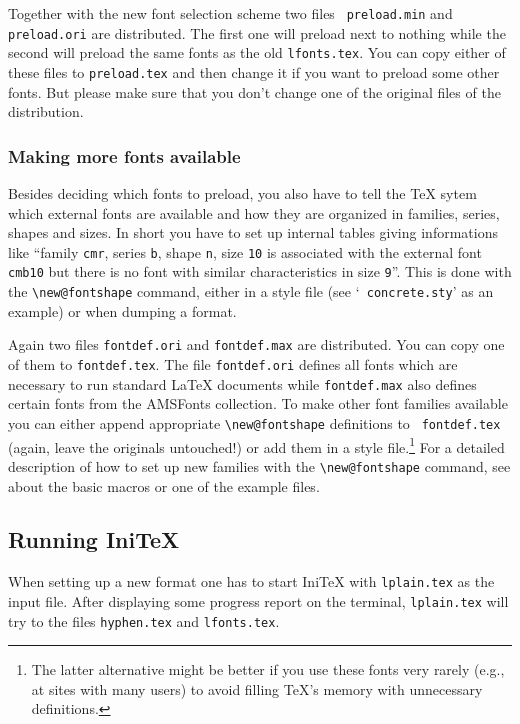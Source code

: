  Together with the new font selection scheme two files {\tt
 preload.min} and {\tt preload.ori} are distributed. The first one
 will preload next to nothing while the second will preload the same
 fonts as the old {\tt lfonts.tex}. You can copy either of these files
 to {\tt preload.tex} and then change it if you want to preload some
 other fonts. But please make sure that you don't change one of the
 original files of the distribution.


\subsubsection{Making more fonts available}

 Besides deciding which fonts to preload, you also have to tell the
 \TeX{} sytem which external fonts are available and how they are
 organized in families, series, shapes and sizes. In short you have to
 set up internal tables giving informations like ``family {\tt cmr},
 series {\tt b}, shape {\tt n}, size {\tt 10} is associated with the
 external font {\tt cmb10} but there is no font with similar
 characteristics in size {\tt 9}''. This is done with the
 \verb+\new@fontshape+ command, either in a style file (see `{\tt
 concrete.sty}' as an example) or when dumping a format.

 Again two files {\tt fontdef.ori} and {\tt fontdef.max} are
 distributed.  You can copy one of them to {\tt fontdef.tex}.  The
 file {\tt fontdef.ori} defines all fonts which are necessary to run
 standard \LaTeX{} documents while {\tt fontdef.max} also defines
 certain fonts from the AMSFonts collection.
 To make other font families available you can
 either append appropriate \verb+\new@fontshape+ definitions to {\tt
 fontdef.tex} (again, leave the originals untouched!) or add them in a
 style file.\footnote{The latter alternative might be better if you
 use these fonts very rarely (e.g., at sites with many users) to
 avoid filling \TeX{}'s memory with unnecessary definitions.} For a
 detailed description of how to set up new families with the
 \verb+\new@fontshape+ command, see \cite{basic} about the basic
 macros or one of the example files.


\subsection{Running Ini\TeX}

 When setting up a new format one has to start Ini\TeX{} with
 {\tt lplain.tex} as the input file. After displaying some progress
 report
 on the terminal, {\tt lplain.tex} will try to \verb++ the files
 {\tt hyphen.tex} and {\tt lfonts.tex}.

